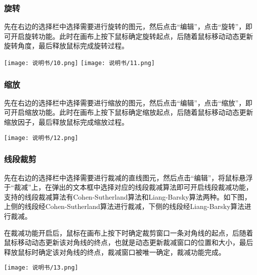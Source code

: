 \documentclass{article}
\begin{document}
		\subsubsection{旋转}
		先在右边的选择栏中选择需要进行旋转的图元，然后点击“编辑”，点击“旋转”，即可开启旋转功能。此时在画布上按下鼠标确定旋转起点，后随着鼠标移动动态更新旋转角度，最后释放鼠标完成旋转过程。
		\begin{center}
			\texttt{[image: 说明书/10.png]}
			\texttt{[image: 说明书/11.png]}
		\end{center}
		
		\subsubsection{缩放}
		先在右边的选择栏中选择需要进行缩放的图元，然后点击“编辑”，点击“缩放”，即可开启缩放功能。此时在画布上按下鼠标确定缩放起点，后随着鼠标移动动态更新缩放因子，最后释放鼠标完成缩放过程。
		\begin{center}
			\texttt{[image: 说明书/12.png]}
		\end{center}
	
		\subsubsection{线段裁剪}
		先在右边的选择栏中选择需要进行裁减的直线图元，然后点击“编辑”，将鼠标悬浮于“裁减”上，在弹出的文本框中选择对应的线段裁减算法即可开启线段裁减功能，支持的线段裁减算法有Cohen-Sutherland算法和Liang-Barsky算法两种。如下图，上侧的线段经Cohen-Sutherland算法进行裁减，下侧的线段经Liang-Barsky算法进行裁减。
		
		在裁减功能开启后，鼠标在画布上按下时确定裁剪窗口一条对角线的起点，后随着鼠标移动动态更新该对角线的终点，也就是动态更新裁减窗口的位置和大小，最后释放鼠标时确定该对角线的终点，裁减窗口被唯一确定，裁减功能完成。
		\begin{center}
			\texttt{[image: 说明书/13.png]}
		\end{center}
\end{document}
